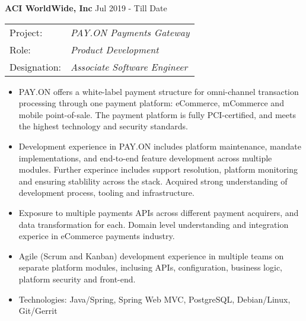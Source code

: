 \documentclass[a4paper]{article}
\begin{document}
\textbf{ACI WorldWide, Inc} \hfill Jul 2019 - Till Date\\
\begin{tabular}{ l l }
Project: & \textit{PAY.ON Payments Gateway} \\
Role: & \textit{Product Development} \\
Designation: & \textit{Associate Software Engineer}
\end{tabular}
\vspace{-1mm}
\begin{itemize} \itemsep 1pt
	\item PAY.ON offers a white-label payment structure for omni-channel transaction processing through one payment platform: eCommerce, mCommerce and mobile point-of-sale. The payment platform is fully PCI-certified, and meets the highest technology and security standards.
	\item Development experience in PAY.ON includes platform maintenance, mandate implementations, and end-to-end feature development across multiple modules. Further experince includes support resolution, platform monitoring and ensuring stablility across the stack. Acquired strong understanding of development process, tooling and infrastructure.
    \item Exposure to multiple payments APIs across different payment acquirers, and data transformation for each. Domain level understanding and integration experice in eCommerce payments industry.
    \item Agile (Scrum and Kanban) development experience in multiple teams on separate platform modules, inclusing APIs, configuration, business logic, platform security and front-end.
	\item Technologies: Java/Spring, Spring Web MVC, PostgreSQL, Debian/Linux, Git/Gerrit
\end{itemize}
\end{document}
